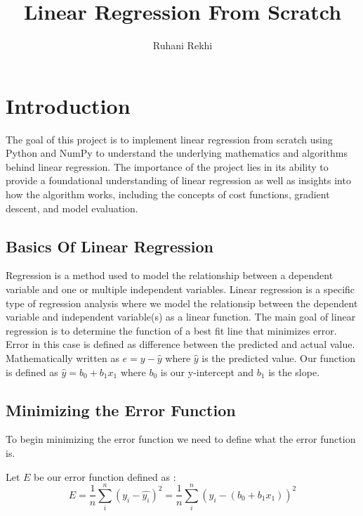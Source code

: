 \documentclass{article}
\title{Linear Regression From Scratch}
\author{Ruhani Rekhi}
\date{}
\begin{document}
\maketitle


\section{Introduction}

The goal of this project is to implement linear regression from scratch using Python and NumPy to understand the underlying mathematics and algorithms behind linear regression.
The importance of the project lies in its ability to provide a foundational understanding of linear regression as well as insights into how the algorithm works, including the concepts of cost functions, gradient descent, and model evaluation.


\subsection{Basics Of Linear Regression}
Regression is a method used to model the relationship between a dependent variable and one or multiple independent variables. Linear regression is a specific type of regression analysis where we model the relationsip between the dependent variable and independent variable(s) as a linear function.
The main goal of linear regression is to determine the function of a best fit line that minimizes error. Error in this case is defined as difference between the predicted and actual value. Mathematically written as $ e = y - \hat{y}  $ where $\hat{y}$ is the predicted value. Our function is defined as $ \hat{y} = b_0 + b_1x_1 $ where $b_0$ is our y-intercept and $b_1$ is the slope. 

\subsection{Minimizing the Error Function}

To begin minimizing the error function we need to define what the error function is. 

Let $E$ be our error function defined as :
\[E = \frac{1}{n} \sum_{i}^{n}(y_i - \hat{y_i})^2
    = \frac{1}{n} \sum_{i}^{n}(y_i - (b_0 + b_1x_1))^2
\]
\end{document}
